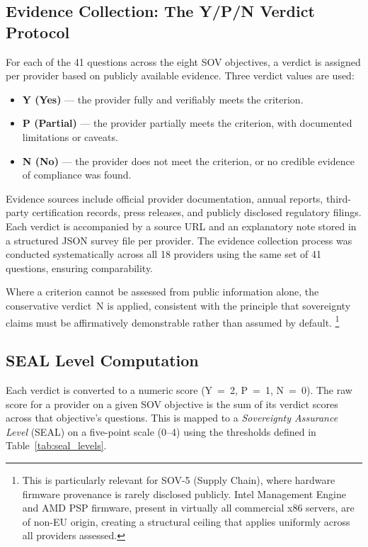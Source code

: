 \subsection{Evidence Collection: The Y/P/N Verdict Protocol}
\label{subsec:ypn_verdicts}

For each of the 41 questions across the eight SOV objectives, a verdict is assigned per provider based on publicly available evidence. Three verdict values are used:

\begin{itemize}
  \item \textbf{Y (Yes)} — the provider fully and verifiably meets the criterion.
  \item \textbf{P (Partial)} — the provider partially meets the criterion, with documented limitations or caveats.
  \item \textbf{N (No)} — the provider does not meet the criterion, or no credible evidence of compliance was found.
\end{itemize}

Evidence sources include official provider documentation, annual reports, third-party certification records, press releases, and publicly disclosed regulatory filings. Each verdict is accompanied by a source URL and an explanatory note stored in a structured JSON survey file per provider. The evidence collection process was conducted systematically across all 18 providers using the same set of 41 questions, ensuring comparability.

Where a criterion cannot be assessed from public information alone, the conservative verdict~N is applied, consistent with the principle that sovereignty claims must be affirmatively demonstrable rather than assumed by default.%
\footnote{This is particularly relevant for SOV-5 (Supply Chain), where hardware firmware provenance is rarely disclosed publicly. Intel Management Engine and AMD PSP firmware, present in virtually all commercial x86 servers, are of non-EU origin, creating a structural ceiling that applies uniformly across all providers assessed.}

\subsection{SEAL Level Computation}
\label{subsec:seal_computation}

Each verdict is converted to a numeric score (Y~=~2, P~=~1, N~=~0). The raw score for a provider on a given SOV objective is the sum of its verdict scores across that objective's questions. This is mapped to a \textit{Sovereignty Assurance Level} (SEAL) on a five-point scale (0--4) using the thresholds defined in Table~\ref{tab:seal_levels}.

